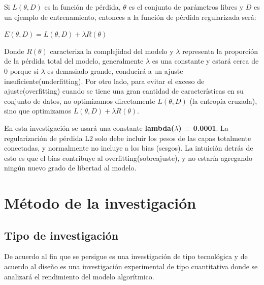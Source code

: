		Si $L(\theta, D)$ es la función de pérdida, $\theta$ es el conjunto de parámetros libres y $D$ es un ejemplo de entrenamiento, entonces a la función de pérdida regularizada será:

			\begingroup\makeatletter{}\check@mathfonts
			\begin{center}
			$E(\theta,D) =L(\theta,D) +\lambda R(\theta)$
			\end{center}
			\endgroup
		

		Donde $R(\theta)$ caracteriza la complejidad del modelo y $\lambda$ representa la proporción de la pérdida total del modelo, generalmente $\lambda$ es una constante y estará cerca de 0 porque si $\lambda$ es demasiado grande, conducirá a un ajuste insuficiente(underfitting). Por otro lado, para evitar el exceso de ajuste(overfitting) cuando se tiene una gran cantidad de características en su conjunto de datos, no optimizamos directamente $L(\theta,D)$ (la entropía cruzada), sino que optimizamos $L(\theta,D) +\lambda R(\theta)$.

		\newpage
		En esta investigación se usará una constante {\bf lambda($\lambda$) = 0.0001}. La regularización de pérdida L2 solo debe incluir los pesos de las capas totalmente conectadas, y normalmente no incluye a los bias (sesgos). La intuición detrás de esto es que el bias contribuye al overfitting(sobreajuste), y no estaría agregando ningún nuevo grado de libertad al modelo.





\section{Método de la investigación}

\subsection{ Tipo de investigación}
	De acuerdo al fin que se persigue es una investigación de tipo tecnológica y de acuerdo al diseño es una investigación experimental de tipo cuantitativa donde se analizará el rendimiento del modelo algorítmico.

